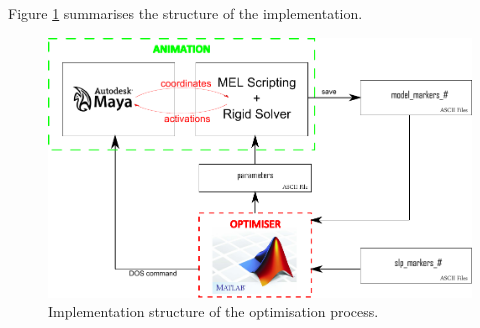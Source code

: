Figure \ref{fig:implementation_schema} summarises the structure of the implementation.
\begin{figure}
	\centering
	 \includegraphics[width=\textwidth]{pics/implementation_schema}
	\caption[Implementation structure of the optimisation process]{\label{fig:implementation_schema}Implementation structure of the optimisation process.}
\end{figure}